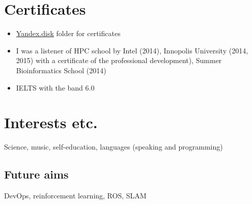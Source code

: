 \documentclass[letterpaper]{twentysecondcv} %
\begin{document}

\section{Certificates}
    {\begin{itemize}
        \item \href{https://yadi.sk/d/aSyzcZ44-_l-8w?w=1}{Yandex.disk} folder for certificates
        \item I was a listener of HPC school by Intel (2014), Innopolis University (2014, 2015) with a certificate of the professional development),
        Summer Bioinformatics School (2014)
        \item IELTS with the band 6.0
    \end{itemize}}

\section{Interests etc.}

Science, music, self-education, languages (speaking and programming)

\subsection{Future aims}

DevOps, reinforcement learning, ROS, SLAM







\end{document}
